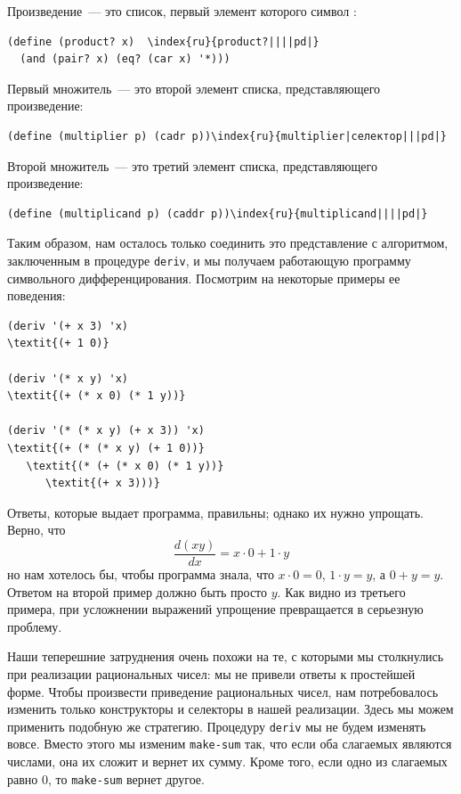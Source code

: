 \begin{plainlist}
\item
Произведение~--- это список, первый элемент
которого символ {\tt *}:

\begin{Verbatim}[fontsize=\small]
(define (product? x)  \index{ru}{product?||||pd|}
  (and (pair? x) (eq? (car x) '*)))
\end{Verbatim}

\item
Первый множитель~--- это второй элемент списка,
представляющего произведение:

\begin{Verbatim}[fontsize=\small]
(define (multiplier p) (cadr p))\index{ru}{multiplier|селектор|||pd|}
\end{Verbatim}

\item
Второй множитель~--- это третий элемент списка,
представляющего произведение:

\begin{Verbatim}[fontsize=\small]
(define (multiplicand p) (caddr p))\index{ru}{multiplicand||||pd|}
\end{Verbatim}
\end{plainlist}
Таким образом, нам осталось только соединить это представление с
алгоритмом, заключенным в процедуре {\tt deriv}, и мы получаем
работающую программу символьного дифференцирования.  Посмотрим на
некоторые примеры ее поведения:

\begin{Verbatim}[fontsize=\small]
(deriv '(+ x 3) 'x)
\textit{(+ 1 0)}

(deriv '(* x y) 'x)
\textit{(+ (* x 0) (* 1 y))}

(deriv '(* (* x y) (+ x 3)) 'x)
\textit{(+ (* (* x y) (+ 1 0))}
   \textit{(* (+ (* x 0) (* 1 y))}
      \textit{(+ x 3)))}
\end{Verbatim}
Ответы, которые выдает программа, правильны; однако их нужно
упрощать.  Верно, что
$$
  \frac{d(xy)}{dx} = x \cdot 0 + 1 \cdot y
$$
но нам хотелось бы, чтобы программа знала, что $x \cdot 0 =
0$, $1 \cdot y = y$, а $0 + y =
y$. Ответом на второй пример должно быть просто $y$.
Как видно из третьего примера, при усложнении выражений упрощение 
превращается в серьезную проблему.

Наши теперешние затруднения очень похожи на те, с которыми 
мы столкнулись при реализации рациональных чисел: мы не привели ответы к 
простейшей форме.  Чтобы произвести приведение рациональных чисел, нам 
потребовалось изменить только конструкторы и селекторы в нашей
реализации.  Здесь мы можем применить подобную же стратегию.
Процедуру {\tt deriv} мы не будем изменять вовсе.  Вместо этого 
мы изменим {\tt make-sum} так, что если оба слагаемых являются
числами, она их сложит и вернет их сумму.  Кроме того, если одно из
слагаемых равно 0, то {\tt make-sum} вернет другое.

